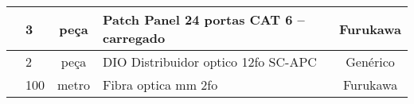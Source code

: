 \begin{table}[H]
{\begin{tabular}{|l|l|c|l|c|}
		& 3                   & peça                                  & Patch Panel 24 portas CAT 6 – carregado                             & Furukawa                                 \\ \hline
		& 2                   & peça                                  & DIO Distribuidor optico 12fo SC-APC                                 & Genérico                                 \\ \hline
		& 100                 & metro                                 & Fibra optica mm 2fo                                                 & Furukawa                                 \\ \hline
	\end{tabular}}
\end{table}